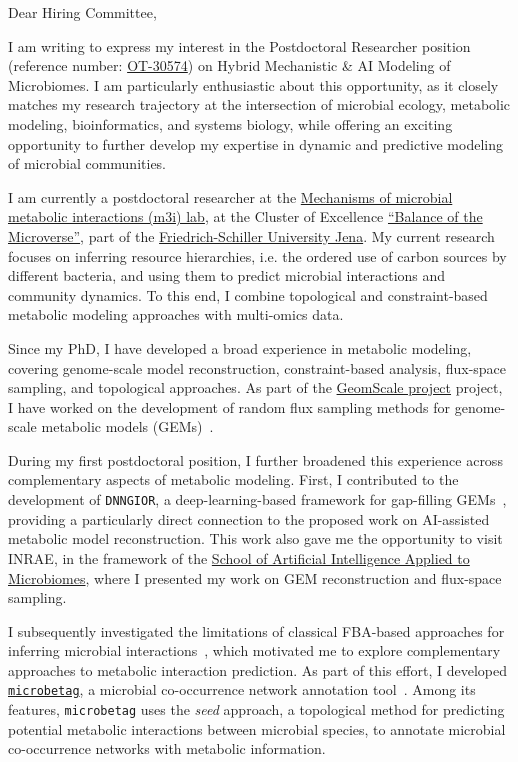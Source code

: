Dear Hiring Committee,

I am writing to express my interest in the Postdoctoral Researcher position (reference number: \href{https://jobs.inrae.fr/en/ot-30574}{OT-30574}) on Hybrid Mechanistic \& AI Modeling of Microbiomes. I am particularly enthusiastic about this opportunity, as it closely matches my research trajectory at the intersection of microbial ecology, metabolic modeling, bioinformatics, and systems biology, while offering an exciting opportunity to further develop my expertise in dynamic and predictive modeling of microbial communities.

I am currently a postdoctoral researcher at the \href{https://m3i-lab.github.io//}{Mechanisms of microbial metabolic interactions (m3i) lab}, at the Cluster of Excellence
\href{https://www.microverse-cluster.de/en/}{\enquote{Balance of the Microverse}}, part of the 
\href{https://www.uni-jena.de/en}{Friedrich-Schiller University Jena}.  
My current research focuses on inferring resource hierarchies, i.e. the ordered use of carbon sources by different bacteria, and using them to predict microbial interactions and community dynamics. 
To this end, I combine topological and constraint-based metabolic modeling approaches with multi-omics data.
 
Since my PhD, I have developed a broad experience in metabolic modeling, covering genome-scale model reconstruction, constraint-based analysis, flux-space sampling, and topological approaches. 
As part of the \href{https://geomscale.github.io/}{GeomScale project} project, I have worked on the development of random flux sampling methods for genome-scale metabolic models (GEMs)~\cite{socg2021,chalkis2024dingo}.

During my first postdoctoral position, I further broadened this experience across complementary aspects of metabolic modeling. First, I contributed to the development of \texttt{DNNGIOR}, a deep-learning-based framework for gap-filling GEMs~\cite{boer2024improving}, providing a particularly direct connection to the proposed work on AI-assisted metabolic model reconstruction. 
This work also gave me the opportunity to visit INRAE, in the framework of the \href{https://ai-microbiome-school.onrender.com/}{School of Artificial Intelligence Applied to Microbiomes}, where I presented my work on GEM reconstruction and flux-space sampling.

I subsequently investigated the limitations of classical FBA-based approaches for inferring microbial interactions~\cite{joseph2024predicting}, which motivated me to explore complementary approaches to metabolic interaction prediction. As part of this effort, I developed \href{https://microbetag.readthedocs.io/}{\texttt{microbetag}}, a microbial co-occurrence network annotation tool~\cite{microbetag2025}. Among its features, \texttt{microbetag} uses the \textit{seed} approach, a topological method for predicting potential metabolic interactions between microbial species, to annotate microbial co-occurrence networks with metabolic information.

